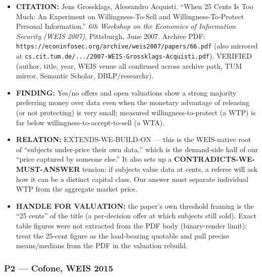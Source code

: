 \documentclass[
  11pt,
]{article}
\providecommand{\tightlist}{%
  \setlength{\itemsep}{0pt}\setlength{\parskip}{0pt}}
\begin{document}
\begin{itemize}
\tightlist
\item
  \textbf{CITATION:} Jens Grossklags, Alessandro Acquisti. ``When 25
  Cents Is Too Much: An Experiment on Willingness-To-Sell and
  Willingness-To-Protect Personal Information.'' \emph{6th Workshop on
  the Economics of Information Security (WEIS 2007)}, Pittsburgh, June
  2007. Archive PDF:
  \texttt{https://econinfosec.org/archive/weis2007/papers/66.pdf} (also
  mirrored at
  \texttt{cs.cit.tum.de/.../2007-WEIS-Grossklags-Acquisti.pdf}).
  VERIFIED (author, title, year, WEIS venue all confirmed across archive
  path, TUM mirror, Semantic Scholar, DBLP/researchr).
\item
  \textbf{FINDING:} Yes/no offers and open valuations show a strong
  majority preferring money over data even when the monetary advantage
  of releasing (or not protecting) is very small; measured
  willingness-to-protect (a WTP) is far below
  willingness-to-accept-to-sell (a WTA).
\item
  \textbf{RELATION:} EXTENDS-WE-BUILD-ON --- this is the WEIS-native
  root of ``subjects under-price their own data,'' which is the
  demand-side half of our ``price captured by someone else.'' It also
  sets up a \textbf{CONTRADICTS-WE-MUST-ANSWER} tension: if subjects
  value data at cents, a referee will ask how it can be a distinct
  capital class. Our answer must separate individual WTP from the
  aggregate market price.
\item
  \textbf{HANDLE FOR VALUATION:} the paper's own threshold framing is
  the ``25 cents'' of the title (a per-decision offer at which subjects
  still sold). Exact table figures were not extracted from the PDF body
  (binary-render limit); treat the 25-cent figure as the load-bearing
  quotable and pull precise means/medians from the PDF in the valuation
  rebuild.
\end{itemize}

\subsubsection{P2 --- Cofone, WEIS 2015}\label{p2-cofone-weis-2015}
\end{document}
